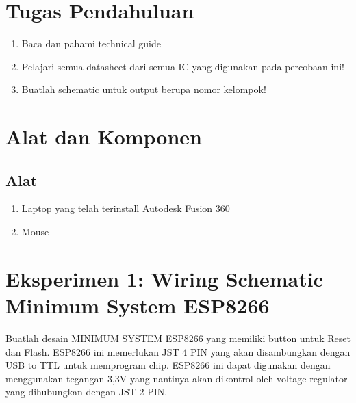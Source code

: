 \section{Tugas Pendahuluan}
\begin{enumerate}
    \item Baca dan pahami technical guide
    \item Pelajari semua datasheet dari semua IC yang digunakan pada percobaan ini!
    \item Buatlah schematic untuk output berupa nomor kelompok!
\end{enumerate}

\section{Alat dan Komponen}
\subsection{Alat}
\begin{enumerate}
    \item Laptop yang telah terinstall Autodesk Fusion 360
    \item Mouse
\end{enumerate}

\section{Eksperimen 1: Wiring Schematic Minimum System ESP8266}
Buatlah desain MINIMUM SYSTEM ESP8266 yang memiliki button untuk Reset dan
Flash. ESP8266 ini memerlukan JST 4 PIN yang akan disambungkan dengan USB to TTL untuk
memprogram chip. ESP8266 ini dapat digunakan dengan menggunakan tegangan 3,3V yang
nantinya akan dikontrol oleh voltage regulator yang dihubungkan dengan JST 2 PIN.

